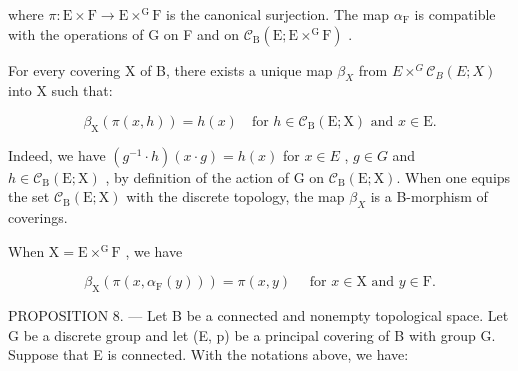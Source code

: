 where \(\pi\colon\mathrm{E}\times\mathrm{F}\to\mathrm{E}\times^{\mathrm{G}}\mathrm{F}\) is the canonical surjection. The map \(\alpha_{\mathrm{F}}\) is compatible with the operations of G on F and on \(\mathcal{C}_{\mathrm{B}}(\mathrm{E};\mathrm{E}\times^{\mathrm{G}}\mathrm{F})\) .

For every covering X of B, there exists a unique map \(\beta_{X}\) from \(E \times^{G} \mathcal{C}_{B}(E; X)\) into X such that:

\[
\beta_ {\mathrm{X}} (\pi (x, h)) = h (x) \quad \text {for } h \in \mathcal {C} _ {\mathrm{B}} (\mathrm{E}; \mathrm{X}) \text { and } x \in \mathrm{E}.\tag{3}
\]

Indeed, we have \((g^{-1}\cdot h)(x\cdot g)=h(x)\) for \(x\in E\) , \(g\in G\) and \(h\in\mathcal{C}_{\mathrm{B}}(\mathrm{E};\mathrm{X})\) , by definition of the action of G on \(\mathcal{C}_{\mathrm{B}}(\mathrm{E};\mathrm{X})\). When one equips the set \(\mathcal{C}_{\mathrm{B}}(\mathrm{E};\mathrm{X})\) with the discrete topology, the map \(\beta_{X}\) is a B-morphism of coverings.

When \(\mathrm{X} = \mathrm{E}\times^{\mathrm{G}}\mathrm{F}\) , we have

\[
\beta_ {\mathrm{X}} \left(\pi \left(x, \alpha_ {\mathrm{F}} (y)\right)\right) = \pi (x, y) \quad \text {   for   } x \in \mathrm{X} \text {   and   } y \in \mathrm{F}.\tag{4}
\]

PROPOSITION 8. --- Let B be a connected and nonempty topological space. Let G be a discrete group and let (E, p) be a principal covering of B with group G. Suppose that E is connected. With the notations above, we have:

